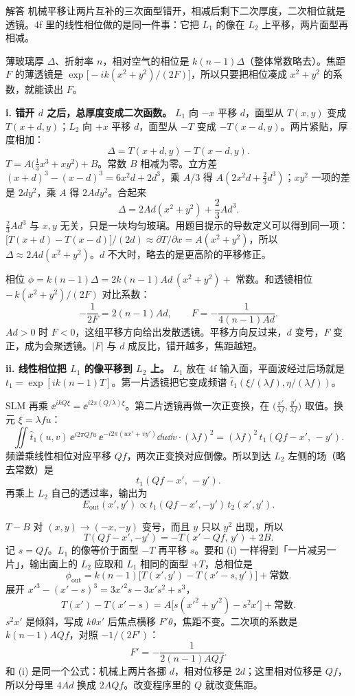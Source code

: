 \begin{exam}{解答}
机械平移让两片互补的三次面型错开，相减后剩下二次厚度，二次相位就是透镜。4f 里的线性相位做的是同一件事：它把 $L_1$ 的像在 $L_2$ 上平移，两片面型再相减。

薄玻璃厚 $\Delta$、折射率 $n$，相对空气的相位是 $k(n-1)\Delta$（整体常数略去）。焦距 $F$ 的薄透镜是 $\exp\bigl[-ik(x^2+y^2)/(2F)\bigr]$，所以只要把相位凑成 $x^2+y^2$ 的系数，就能读出 $F$。

\textbf{i. 错开 $d$ 之后，总厚度变成二次函数。}
$L_1$ 向 $-x$ 平移 $d$，面型从 $T(x,y)$ 变成 $T(x+d,y)$；$L_2$ 向 $+x$ 平移 $d$，面型从 $-T$ 变成 $-T(x-d,y)$。两片紧贴，厚度相加：
\[
\Delta=T(x+d,y)-T(x-d,y).
\]
$T=A\bigl(\frac13 x^3+xy^2\bigr)+B$。常数 $B$ 相减为零。立方差 $(x+d)^3-(x-d)^3=6x^2d+2d^3$，乘 $A/3$ 得 $A(2x^2d+\frac23 d^3)$；$xy^2$ 一项的差是 $2dy^2$，乘 $A$ 得 $2Ady^2$。合起来
\[
\Delta=2Ad(x^2+y^2)+\frac23 Ad^3 .
\]
$\frac23 Ad^3$ 与 $x,y$ 无关，只是一块均匀玻璃。用题目提示的导数定义可以得到同一项：$\bigl[T(x+d)-T(x-d)\bigr]/(2d)\approx\partial T/\partial x=A(x^2+y^2)$，所以 $\Delta\approx2Ad(x^2+y^2)$。$d$ 不大时，略去的是更高阶的平移修正。

相位 $\phi=k(n-1)\Delta=2k(n-1)Ad\,(x^2+y^2)+$ 常数。和透镜相位 $-\,k(x^2+y^2)/(2F)$ 对比系数：
\[
-\frac{1}{2F}=2(n-1)Ad,\qquad\boxed{F=-\frac{1}{4(n-1)Ad}} .
\]
$Ad>0$ 时 $F<0$，这组平移方向给出发散透镜。平移方向反过来，$d$ 变号，$F$ 变正，成为会聚透镜。$|F|$ 与 $d$ 成反比，错开越多，焦距越短。

\textbf{ii. 线性相位把 $L_1$ 的像平移到 $L_2$ 上。}
$L_1$ 放在 4f 输入面，平面波经过后场就是 $t_1=\exp[ik(n-1)T]$。第一片透镜把它变成频谱 $\hat t_1(\xi/(\lambda f),\eta/(\lambda f))$。

SLM 再乘 $\ee^{ikQ\xi}=\ee^{i2\pi(Q/\lambda)\xi}$。第二片透镜再做一次正变换，在 $\big(\frac{x'}{\lambda f},\frac{y'}{\lambda f}\big)$ 取值。换元 $\xi=\lambda fu$：
\[
\iint\hat t_1(u,v)\,\ee^{i2\pi Qfu}\,\ee^{-i2\pi(ux'+vy')}\dd u\dd v\cdot(\lambda f)^2=(\lambda f)^2\,t_1(Qf-x',\,-y').
\]
频谱乘线性相位对应平移 $Qf$，两次正变换对应倒像。所以到达 $L_2$ 左侧的场（略去常数）是
\[
t_1(Qf-x',\,-y') .
\]
再乘上 $L_2$ 自己的透过率，输出为
\[
\boxed{E_{\text{out}}(x',y')\propto t_1(Qf-x',-y')\,t_2(x',y')} .
\]

$T-B$ 对 $(x,y)\to(-x,-y)$ 变号，而且 $y$ 只以 $y^2$ 出现，所以
\[
T(Qf-x',-y')=-T(x'-Qf,\,y')+2B .
\]
记 $s=Qf$。$L_1$ 的像等价于面型 $-T$ 再平移 $s$。要和 (i) 一样得到「一片减另一片」，输出面上的 $L_2$ 应取和 $L_1$ 相同的面型 $+T$，总相位是
\[
\phi_{\text{out}}=k(n-1)\bigl[T(x',y')-T(x'-s,y')\bigr]+\text{常数}.
\]
展开 $x'^3-(x'-s)^3=3x'^2s-3x's^2+s^3$，
\[
T(x')-T(x'-s)=A\bigl[s(x'^2+y'^2)-s^2 x'\bigr]+\text{常数}.
\]
$s^2 x'$ 是倾斜，写成 $k\theta x'$ 后焦点横移 $F'\theta$，焦距不变。二次项的系数是 $k(n-1)AQf$，对照 $-1/(2F')$：
\[
\boxed{F'=-\frac{1}{2(n-1)AQf}} .
\]
和 (i) 是同一个公式：机械上两片各挪 $d$，相对位移是 $2d$；这里相对位移是 $Qf$，所以分母里 $4Ad$ 换成 $2AQf$。改变程序里的 $Q$ 就改变焦距。


\end{exam}
